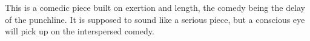 This is a comedic piece built on exertion and length, the comedy being the delay of the punchline. It is supposed to sound like a serious piece, but a conscious eye will pick up on the interspersed comedy.
